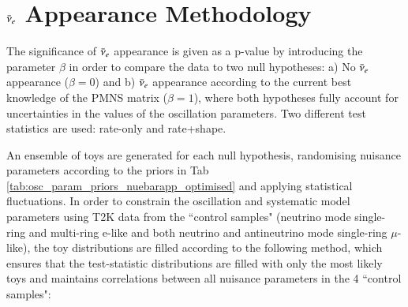 \section {$\bar{\nu}_{e}$ Appearance Methodology}
\label{sec:method}

The significance of $\bar{\nu}_{e}$ appearance is given as a p-value by introducing the parameter $\beta$ in order to compare the data to two null hypotheses: a) No $\bar{\nu}_{e}$ appearance ($\beta = 0$) and b) $\bar{\nu}_{e}$ appearance according to the current best knowledge of the PMNS matrix ($\beta = 1$), where both hypotheses fully account for uncertainties in the values of the oscillation parameters. Two different test statistics are used: rate-only and rate+shape. 

An ensemble of toys are generated for each null hypothesis, randomising nuisance parameters according to the priors in Tab \ref{tab:osc_param_priors_nuebarapp_optimised} and applying statistical fluctuations. In order to constrain the oscillation and systematic model parameters using T2K data from the ``control samples" (neutrino mode single-ring and multi-ring e-like and both neutrino and antineutrino mode single-ring $\mu$-like), the toy distributions are {\color{red} filled} according to the following method, which ensures that the test-statistic distributions are filled with only the most likely toys and maintains correlations between all nuisance parameters in the 4 ``control samples":

